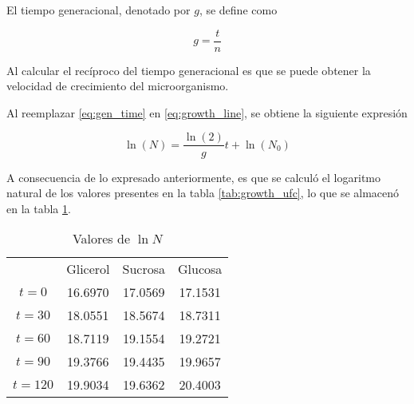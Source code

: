 El tiempo generacional, denotado por $g$, se define como

\begin{equation}
  g = \frac{t}{n}
  \label{eq:gen_time}
\end{equation}

Al calcular el recíproco del tiempo generacional es que se puede obtener la velocidad de crecimiento del microorganismo. 

Al reemplazar \eqref{eq:gen_time} en \eqref{eq:growth_line}, se obtiene la siguiente expresión

\begin{equation}
  \ln(N) = \frac{\ln(2)}{g} t + \ln(N_0)
\end{equation}

A consecuencia de lo expresado anteriormente, es que se calculó el logaritmo natural de los valores presentes en la tabla \ref{tab:growth_ufc}, lo que se almacenó en la tabla \ref{tab:growth_log}.

\begin{table}[H]
  \centering
  \begin{tabular}{cccc}\toprule
    & Glicerol & Sucrosa & Glucosa \\ \cmidrule{2-4}
    $t=0$ & 16.6970 & 17.0569 & 17.1531 \\ 
    $t=30$ & 18.0551 & 18.5674 & 18.7311 \\ 
    $t=60$ & 18.7119 & 19.1554 & 19.2721 \\ 
    $t=90$ & 19.3766 & 19.4435 & 19.9657 \\ 
    $t=120$ & 19.9034 & 19.6362 & 20.4003 \\ \bottomrule
  \end{tabular}
  \caption{Valores de $\ln N$}
  \label{tab:growth_log}
\end{table}

